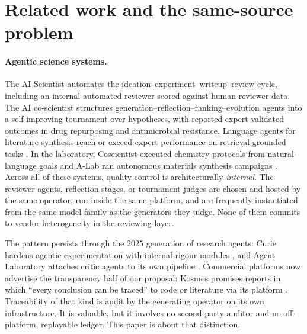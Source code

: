 \documentclass[11pt]{article}
\begin{document}
\section{Related work and the same-source problem}\label{sec:related}

\paragraph{Agentic science systems.} The AI Scientist \cite{lu2024aiscientist,yamada2025aisv2,lu2026nature} automates the ideation--experiment--writeup--review cycle, including an internal automated reviewer scored against human reviewer data. The AI co-scientist \cite{gottweis2025coscientist} structures generation--reflection--ranking--evolution agents into a self-improving tournament over hypotheses, with reported expert-validated outcomes in drug repurposing and antimicrobial resistance. Language agents for literature synthesis reach or exceed expert performance on retrieval-grounded tasks \cite{skarlinski2024}.  In the laboratory, Coscientist executed chemistry protocols from natural-language goals \cite{boiko2023} and A-Lab ran autonomous materials synthesis campaigns \cite{szymanski2023}. Across all of these systems, quality control is architecturally \emph{internal}. The reviewer agents, reflection stages, or tournament judges are chosen and hosted by the same operator, run inside the same platform, and are frequently instantiated from the same model family as the generators they judge. None of them commits to vendor heterogeneity in the reviewing layer.

The pattern persists through the 2025 generation of research agents: Curie hardens agentic experimentation with internal rigour modules \cite{kon2025curie}, and Agent Laboratory attaches critic agents to its own pipeline \cite{schmidgall2025agentlab}. Commercial platforms now advertise the transparency half of our proposal: Kosmos promises reports in which ``every conclusion can be traced'' to code or literature via its platform \cite{edison2025kosmos}. Traceability of that kind is audit by the generating operator on its own infrastructure. It is valuable, but it involves no second-party auditor and no off-platform, replayable ledger. This paper is about that distinction.
\end{document}
